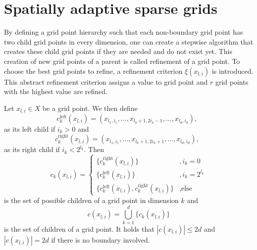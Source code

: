 \documentclass[
  a4paper,  %
  twoside,  %
  bibliography=totoc,
  headsepline,
  cleardoublepage=empty,
  parskip=half,
  draft=false
]{scrbook}
\begin{document}

\section{Spatially adaptive sparse grids}

By defining a grid point hierarchy such that each non-boundary grid point has two child grid points in every dimension, one can create a stepwise algorithm that creates these child grid points if they are needed and do not exist yet.
This creation of new grid points of a parent is called refinement of a grid point.
To choose the best grid points to refine, a refinement criterion $\xi(x_{\underline{l},\underline{i}})$ is introduced.
This abstract refinement criterion assigns a value to grid point and $r$ grid points with the highest value are refined.
\begin{definition}
Let $x_{\underline{l},\underline{i}} \in X$ be a grid point.
We then define
\begin{equation}
c_{k}^{\text{left}}(x_{\underline{l},\underline{i}})=(x_{l_1,i_1}, \dots, x_{l_k + 1,2  i_k - 1}, \dots, x_{l_d,i_d}), ~~ 
\end{equation}
as its left child if $i_k > 0$ and
\begin{equation}
c_{k}^{\text{right}}(x_{\underline{l},\underline{i}})=(x_{l_1,i_1}, \dots, x_{l_k + 1,2  i_k + 1}, \dots, x_{l_d,i_d}), ~~ 
\end{equation}
as its right child if $i_k < 2^{l_k}$.
Then
\begin{equation}
c_{k}(x_{\underline{l},\underline{i}})=
\begin{cases}
\{c_{k}^{\text{right}}(x_{\underline{l},\underline{i}})\}&, i_k=0\\
\{c_{k}^{\text{left}}(x_{\underline{l},\underline{i}})\}&,i_k= 2^{l_k}\\
\{c_{k}^{\text{left}}(x_{\underline{l},\underline{i}}),c_{k}^{\text{right}}(x_{\underline{l},\underline{i}}) \}&, \text{else}
\end{cases}
\end{equation}
is the set of possible children of a grid point in dimension $k$ and 
\begin{equation}
c(x_{\underline{l},\underline{i}})= \bigcup_{k=1}^d \{c_{k}(x_{\underline{l},\underline{i}})\}
\end{equation}
is the set of children of a grid point. It holds that $|c(x_{\underline{l},\underline{i}})| \leq 2d$ and $|c(x_{\underline{l},\underline{i}})| =2d$ if there is no boundary involved.
\end{definition}
\end{document}
